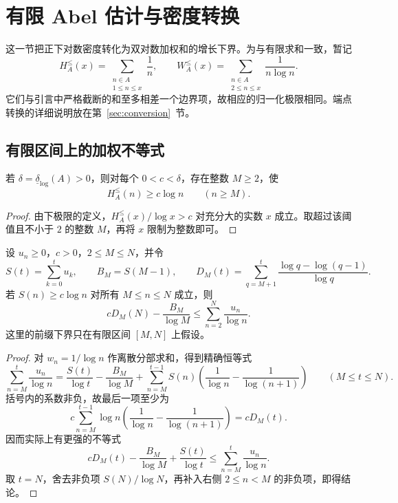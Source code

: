 \section{有限 Abel 估计与密度转换}\label{sec:density}
这一节把正下对数密度转化为双对数加权和的增长下界。为与有限求和一致，暂记
\[
 H_A^{\le}(x)=\sum_{\substack{n\in A\\1\le n\le x}}\frac1n,
 \qquad W_A^{\le}(x)=\sum_{\substack{n\in A\\2\le n\le x}}\frac1{n\log n}.
\]
它们与引言中严格截断的和至多相差一个边界项，故相应的归一化极限相同。端点转换的详细说明放在第~\ref{sec:conversion}~节。

\subsection{有限区间上的加权不等式}
\begin{lemma}[下极限的最终下界]\label{lem:eventual}
若 $\delta=\underline\delta_{\log}(A)>0$，则对每个 $0<c<\delta$，存在整数 $M\ge2$，使
\begin{equation}\label{eq:lowerH}
 H_A^{\le}(n)\ge c\log n\qquad(n\ge M).
\end{equation}
\end{lemma}
\begin{proof}
由下极限的定义，$H_A^{\le}(x)/\log x>c$ 对充分大的实数 $x$ 成立。取超过该阈值且不小于 $2$ 的整数 $M$，再将 $x$ 限制为整数即可。
\end{proof}

\begin{lemma}[有限 Abel 下界]\label{lem:abel}
设 $u_n\ge0$，$c>0$，$2\le M\le N$，并令
\[
 S(t)=\sum_{k=0}^{t}u_k,\qquad B_M=S(M-1),\qquad
 D_M(t)=\sum_{q=M+1}^{t}\frac{\log q-\log(q-1)}{\log q}.
\]
若 $S(n)\ge c\log n$ 对所有 $M\le n\le N$ 成立，则
\begin{equation}\label{eq:finite-abel}
 cD_M(N)-\frac{B_M}{\log M}
 \le \sum_{n=2}^{N}\frac{u_n}{\log n}.
\end{equation}
这里的前缀下界只在有限区间 $[M,N]$ 上假设。
\end{lemma}
\begin{proof}
对 $w_n=1/\log n$ 作离散分部求和，得到精确恒等式
\begin{equation}\label{eq:abel}
 \sum_{n=M}^{t}\frac{u_n}{\log n}
 =\frac{S(t)}{\log t}-\frac{B_M}{\log M}
 +\sum_{n=M}^{t-1}S(n)
       \left(\frac1{\log n}-\frac1{\log(n+1)}\right)
 \qquad(M\le t\le N).
\end{equation}
括号内的系数非负，故最后一项至少为
\[
 c\sum_{n=M}^{t-1}\log n
       \left(\frac1{\log n}-\frac1{\log(n+1)}\right)
 =cD_M(t).
\]
因而实际上有更强的不等式
\begin{equation}\label{eq:strong-abel}
 cD_M(t)-\frac{B_M}{\log M}+\frac{S(t)}{\log t}
 \le\sum_{n=M}^{t}\frac{u_n}{\log n}.
\end{equation}
取 $t=N$，舍去非负项 $S(N)/\log N$，再补入右侧 $2\le n<M$ 的非负项，即得结论。
\end{proof}

